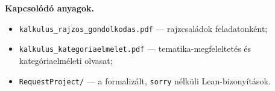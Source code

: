 \documentclass[11pt,a4paper]{article}
\newcommand{\lean}[1]{\texttt{\small #1}}
\theoremstyle{definition}
\begin{document}
\bigskip
\noindent\textbf{Kapcsolódó anyagok.}
\begin{itemize}[nosep,leftmargin=*]
  \item \lean{kalkulus\_rajzos\_gondolkodas.pdf} --- rajzcsaládok feladatonként;
  \item \lean{kalkulus\_kategoriaelmelet.pdf} --- tematika-megfeleltetés és
        kategóriaelméleti olvasat;
  \item \lean{RequestProject/} --- a formalizált, \lean{sorry} nélküli Lean-bizonyítások.
\end{itemize}
\end{document}
